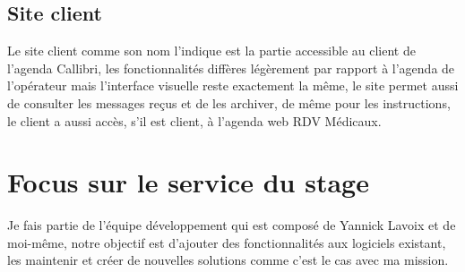 \subsection{Site client}
Le site client comme son nom l'indique est la partie accessible au client de l'agenda \gls{Callibri},
les fonctionnalités diffères légèrement par rapport à l'agenda de l'opérateur mais l'interface 
visuelle reste exactement la même, le site permet aussi de consulter les messages reçus et de les archiver, de même pour les instructions,
le client a aussi accès, s'il est client, à l'agenda web RDV Médicaux.\newline
\newpage



\section{Focus sur le service du stage}
Je fais partie de l'équipe développement qui est composé de Yannick Lavoix et de moi-même, 
notre objectif est d'ajouter des fonctionnalités aux logiciels existant, 
les maintenir et créer de nouvelles solutions comme c'est le cas avec ma mission.\newline

